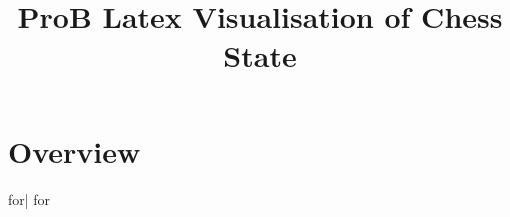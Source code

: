 \documentclass[final]{llncs}
\newcommand{\probif}[3]{if} %
\newcommand{\probfor}[3]{for} %
\begin{document}
%


\pagestyle{empty}  %

%
\mainmatter              %
%

\title{ProB Latex Visualisation of Chess State}
%
%
%
%
%

\maketitle              %


\section{Overview}

 

\begin{center}
\begin{tabular}{\probfor{ii}{1..8}{|c}|}
\hline
\probfor{ii}{1..8}{  \probfor{jj}{1..8}{  \probif{(ii,jj):dom(white)}{\WhiteQueenOnWhite}{\probif{(ii,jj):dom(black)}{\BlackQueenOnWhite}{\BlackEmptySquare}} \probif{jj<8}{&}{\\}} \hline}
\end{tabular}
\end{center}
\end{document}
